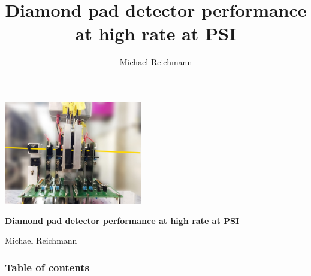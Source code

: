 \documentclass[9pt]{beamer}
\title[Pad Performance]{Diamond pad detector performance at high rate at PSI}
\author[M. Reichmann]{Michael Reichmann}
\institute[\textbf{\textit{ETH}}\scalebox{.6}{\textit{Z\"{u}rich}}]{Swiss Federal Institute of Technology Zurich}
\begin{document}
\begin{frame}
	\begin{center}
		\includegraphics[width=6cm]{Setup1}
	\end{center}
	\begin{alertblock}{
		\begin{center}
			\textbf{Diamond pad detector performance at high rate at PSI}
		\end{center}}
		\vspace*{10pt}
		\begin{center}\small
		Michael Reichmann
		\end{center}\normalsize
	\end{alertblock}
\end{frame}
\begin{frame}[allowframebreaks]
	\frametitle{Table of contents}
	\tableofcontents   %
\end{frame}
\end{document}
